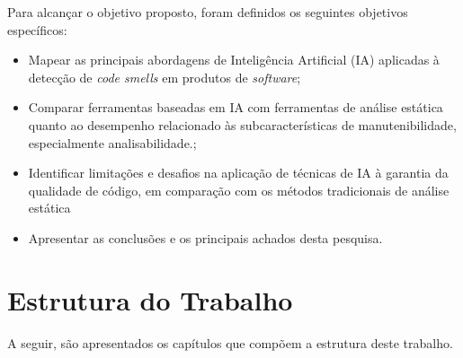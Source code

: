     Para alcançar o objetivo proposto, foram definidos os seguintes objetivos específicos:

\begin{itemize}
	\item Mapear as principais abordagens de Inteligência Artificial (IA) aplicadas à detecção de \textit{code smells} em produtos de \textit{software};
	\item Comparar ferramentas baseadas em IA com ferramentas de análise estática quanto ao desempenho 
    relacionado às subcaracterísticas de manutenibilidade, especialmente analisabilidade.;
    \item Identificar limitações e desafios na aplicação de técnicas de IA à garantia da qualidade de 
    código, em comparação com os métodos tradicionais de análise estática
    \item  Apresentar as conclusões e os principais achados  desta pesquisa.

\end{itemize}

\section{Estrutura do Trabalho}
\label{sec:estrutura-monografia}

A seguir, são apresentados os capítulos que compõem a estrutura deste trabalho.

